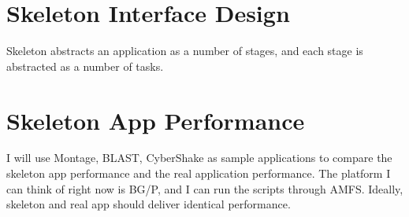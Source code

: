 \documentclass[10pt,a4paper]{article}
\begin{document}
\section{Skeleton Interface Design}
Skeleton abstracts an application as a number of stages, and each stage is abstracted as a number of tasks. 

\section{Skeleton App Performance}
I will use Montage, BLAST, CyberShake as sample applications to compare the skeleton app performance and the real application performance. The platform I can think of right now is BG/P, and I can run the scripts through AMFS. Ideally, skeleton and real app should deliver identical performance.
\end{document}
